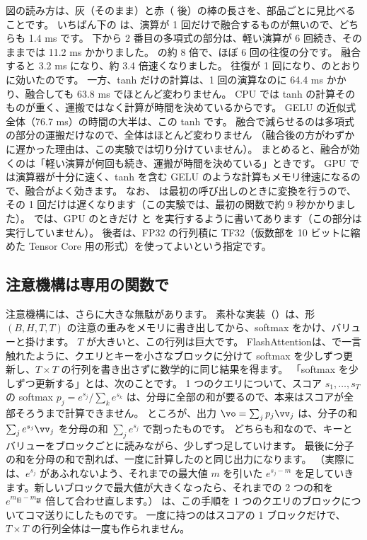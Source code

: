 図の読み方は、灰（そのまま）と赤（ 後）の棒の長さを、部品ごとに見比べることです。
いちばん下の  は、演算が 1 回だけで融合するものが無いので、どちらも 1.4 ms です。
下から 2 番目の多項式の部分は、軽い演算が 6 回続き、そのままでは 11.2 ms かかりました。
 の約 8 倍で、ほぼ 6 回の往復の分です。
融合すると 3.2 ms になり、約 3.4 倍速くなりました。
往復が 1 回になり、のとおりに効いたのです。
一方、tanh だけの計算は、1 回の演算なのに 64.4 ms かかり、融合しても 63.8 ms でほとんど変わりません。
CPU では tanh の計算そのものが重く、運搬ではなく計算が時間を決めているからです。
GELU の近似式全体（76.7 ms）の時間の大半は、この tanh です。
融合で減らせるのは多項式の部分の運搬だけなので、全体はほとんど変わりません
（融合後の方がわずかに遅かった理由は、この実験では切り分けていません）。
まとめると、融合が効くのは「軽い演算が何回も続き、運搬が時間を決めている」ときです。
GPU では演算器が十分に速く、tanh を含む GELU のような計算もメモリ律速になるので、融合がよく効きます。
なお、 は最初の呼び出しのときに変換を行うので、その 1 回だけは遅くなります（この実験では、最初の関数で約 9 秒かかりました）。
 では、GPU のときだけ  と  を実行するように書いてあります（この部分は実行していません）。
後者は、FP32 の行列積に TF32（仮数部を 10 ビットに縮めた Tensor Core 用の形式）を使ってよいという指定です。

\subsection*{注意機構は専用の関数で}

注意機構には、さらに大きな無駄があります。
素朴な実装（）は、形 $(B,H,T,T)$ の注意の重みをメモリに書き出してから、softmax をかけ、バリューと掛けます。
$T$ が大きいと、この行列は巨大です。
FlashAttention\cite{dao2022flashattention}は、で一言触れたように、クエリとキーを小さなブロックに分けて softmax を少しずつ更新し、$T\times T$ の行列を書き出さずに数学的に同じ結果を得ます。
「softmax を少しずつ更新する」とは、次のことです。
1 つのクエリについて、スコア $s_1,\dots,s_T$ の softmax $p_j=e^{s_j}/\sum_k e^{s_k}$ は、分母に全部の和が要るので、本来はスコアが全部そろうまで計算できません。
ところが、出力 $\vo=\sum_j p_j\vv_j$ は、分子の和 $\sum_j e^{s_j}\vv_j$ を分母の和 $\sum_j e^{s_j}$ で割ったものです。
どちらも和なので、キーとバリューをブロックごとに読みながら、少しずつ足していけます。
最後に分子の和を分母の和で割れば、一度に計算したのと同じ出力になります。
（実際には、$e^{s_j}$ があふれないよう、それまでの最大値 $m$ を引いた $e^{s_j-m}$ を足していきます。新しいブロックで最大値が大きくなったら、それまでの 2 つの和を $e^{m_{\text{旧}}-m_{\text{新}}}$ 倍して合わせ直します。）
は、この手順を 1 つのクエリのブロックについてコマ送りにしたものです。
一度に持つのはスコアの 1 ブロックだけで、$T\times T$ の行列全体は一度も作られません。

